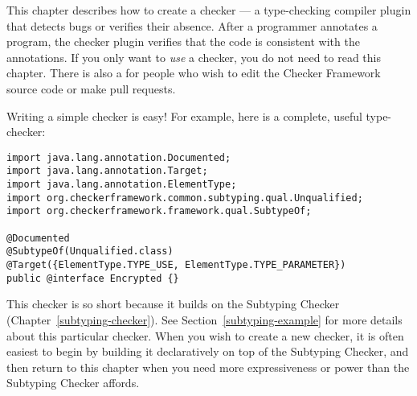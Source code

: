 \htmlhr
{}
\label{writing-a-checker} %

\newcommand{\TreeAPIBase}{https://docs.oracle.com/en/java/javase/11/docs/api/jdk.compiler/com/sun/source}
\newcommand{\refTreeclass}[2]{\href{\TreeAPIBase{}/#1/#2.html?is-external=true}{\<#2>}}
\newcommand{\ModelAPIBase}{https://docs.oracle.com/en/java/javase/11/docs/api/java.compiler/javax/lang/model}
\newcommand{\refModelclass}[2]{\href{\ModelAPIBase{}/#1/#2.html?is-external=true}{\<#2>}}

This chapter describes how to create a checker
--- a type-checking compiler plugin that detects bugs or verifies their
absence.  After a programmer annotates a program,
the checker plugin verifies that the code is consistent
with the annotations.
If you only want to \emph{use} a checker, you do not need to read this
chapter.
There is also a
 for people who wish to edit the Checker Framework source code or
make pull requests.


Writing a simple checker is easy!  For example, here is a complete, useful
type-checker:

\begin{Verbatim}
import java.lang.annotation.Documented;
import java.lang.annotation.Target;
import java.lang.annotation.ElementType;
import org.checkerframework.common.subtyping.qual.Unqualified;
import org.checkerframework.framework.qual.SubtypeOf;

@Documented
@SubtypeOf(Unqualified.class)
@Target({ElementType.TYPE_USE, ElementType.TYPE_PARAMETER})
public @interface Encrypted {}
\end{Verbatim}

This checker is so short because it builds on the Subtyping Checker
(Chapter~\ref{subtyping-checker}).
See Section~\ref{subtyping-example} for more details about this particular checker.
When you wish to create a new checker, it is often easiest to begin by
building it declaratively on top of the Subtyping Checker, and then return to
this chapter when you need more expressiveness or power than the Subtyping
Checker affords.

